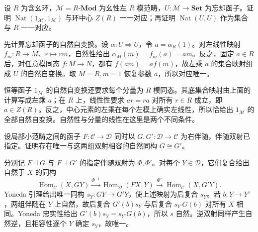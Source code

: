 \begin{exercise}\label{b4:ex:03-center-natural-endomorphisms}
	设 \(R\) 为含幺环，\(\mathcal M=R\text{-}\mathbf{Mod}\) 为幺性左 \(R\) 模范畴，\(U:\mathcal M\rightarrow\mathbf{Set}\) 为忘却函子。证明 \(\operatorname{Nat}(1_{\mathcal M},1_{\mathcal M})\) 与环中心 \(Z(R)\) 一一对应；再证明 \(\operatorname{Nat}(U,U)\) 作为集合与 \(R\) 一一对应。
\end{exercise}
\begin{solution}
	先计算忘却函子的自然自变换。设 \(\alpha:U\Rightarrow U\)，令 \(a=\alpha_R(1)\)。对左线性映射 \(f_m:R\rightarrow M\)、\(r\mapsto rm\)，自然性给出 \(\alpha_M(m)=f_m(a)=am\)。反之，固定 \(a\in R\) 后，对任意模同态 \(f:M\rightarrow N\)，都有 \(f(am)=af(m)\)，故左乘 \(a\) 的集合映射组成 \(U\) 的自然自变换。取 \(M=R,m=1\) 恢复参数 \(a\)，所以对应唯一。

	恒等函子 \(1_{\mathcal M}\) 的自然自变换还要求每个分量为 \(R\) 模同态。其底集合映射由上面的计算写成左乘 \(a\)；在 \(R\) 上，线性性要求 \(ar=ra\) 对所有 \(r\in R\) 成立，即 \(a\in Z(R)\)。反之，中心元素的左乘在每个左模上确实左线性，所以恰给出 \(1_{\mathcal M}\) 的全部自然自变换。自然性与分量的线性在这里是两个不同条件。
\end{solution}

\begin{exercise}\label{b4:ex:03-adjoint-unique}
	设局部小范畴之间的函子 \(F:\mathcal C\rightarrow\mathcal D\) 同时以 \(G,G':\mathcal D\rightarrow\mathcal C\) 为右伴随，伴随双射已指定。证明存在唯一与这两组双射相容的自然同构 \(G\cong G'\)。
\end{exercise}
\begin{solution}
	分别记 \(F\dashv G\) 与 \(F\dashv G'\) 的指定伴随双射为 \(\Phi,\Phi'\)。对每个 \(Y\in\mathcal D\)，它们复合给出自然于 \(X\) 的同构
	\[
		\operatorname{Hom}_{\mathcal C}(X,GY) \xrightarrow{\Phi^{-1}}\operatorname{Hom}_{\mathcal D}(FX,Y) \xrightarrow{\Phi'}\operatorname{Hom}_{\mathcal C}(X,G'Y).
	\]
	Yoneda 引理给出唯一同构 \(s_Y:GY\rightarrow G'Y\)，使上述映射为后复合 \(s_Y\)。若 \(b:Y\rightarrow Y'\)，两组伴随在 \(Y\) 上自然，故后复合 \(G'(b)s_Y\) 与后复合 \(s_{Y'}G(b)\) 对所有 \(X\) 相同。Yoneda 忠实性给出 \(G'(b)s_Y=s_{Y'}G(b)\)，所以 \(s\) 自然。逆双射同样产生自然逆，且相容性逐个 \(Y\) 确定 \(s_Y\)，故唯一。
\end{solution}

